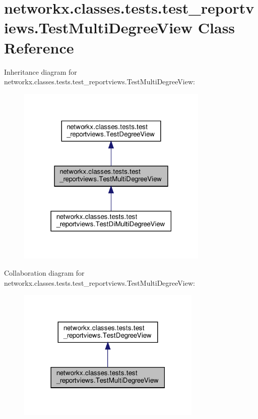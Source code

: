 \hypertarget{classnetworkx_1_1classes_1_1tests_1_1test__reportviews_1_1TestMultiDegreeView}{}\section{networkx.\+classes.\+tests.\+test\+\_\+reportviews.\+Test\+Multi\+Degree\+View Class Reference}
\label{classnetworkx_1_1classes_1_1tests_1_1test__reportviews_1_1TestMultiDegreeView}


Inheritance diagram for networkx.\+classes.\+tests.\+test\+\_\+reportviews.\+Test\+Multi\+Degree\+View\+:
\nopagebreak
\begin{figure}[H]
\begin{center}
\leavevmode
\includegraphics[width=259pt]{classnetworkx_1_1classes_1_1tests_1_1test__reportviews_1_1TestMultiDegreeView__inherit__graph}
\end{center}
\end{figure}


Collaboration diagram for networkx.\+classes.\+tests.\+test\+\_\+reportviews.\+Test\+Multi\+Degree\+View\+:
\nopagebreak
\begin{figure}[H]
\begin{center}
\leavevmode
\includegraphics[width=249pt]{classnetworkx_1_1classes_1_1tests_1_1test__reportviews_1_1TestMultiDegreeView__coll__graph}
\end{center}
\end{figure}
